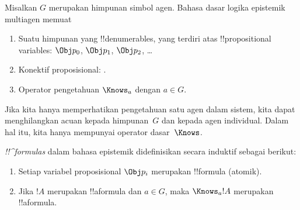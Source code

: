 \documentclass[../../../include/open-logic-section]{subfiles}
\begin{document}


\begin{defn}
Misalkan $G$ merupakan himpunan simbol agen. Bahasa dasar logika epistemik
multiagen memuat
\begin{enumerate}
  \item Suatu himpunan yang !!{denumerable}s, yang terdiri atas
    !!{propositional variable}s: $\Obj p_0$, $\Obj p_1$, $\Obj p_2$, \dots
  \item Konektif proposisional: \startycommalist
  .
  \item Operator pengetahuan $\Knows_a$ dengan $a\in G$.
\end{enumerate}
\end{defn}

Jika kita hanya memperhatikan pengetahuan satu agen dalam sistem, kita dapat
menghilangkan acuan kepada himpunan~$G$ dan kepada agen individual. Dalam
hal itu, kita hanya mempunyai operator dasar~$\Knows$.

\begin{defn}
\emph{!!^{formula}s} dalam bahasa epistemik didefinisikan secara induktif
sebagai berikut:
\begin{enumerate}


\item Setiap variabel proposisional $\Obj p_i$ merupakan !!{formula}
  (atomik).






\item Jika $!A$ merupakan !!a{formula} dan $a\in G$, maka $\Knows_a !A$
  merupakan !!a{formula}.

\end{enumerate}
\end{defn}
\end{document}
